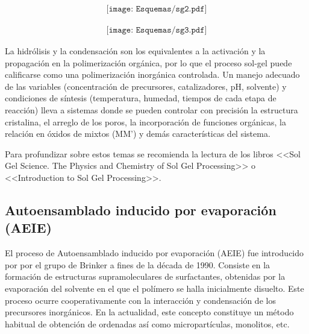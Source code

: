 			\begin{equation}
		    	\begin{aligned}
 	 	 		\texttt{[image: Esquemas/sg2.pdf]}
 	 	 		\end{aligned}
 	 	 		\label{eq:oxosg2}
 	 	 		\end{equation}

			\begin{equation}
 	 	 		\begin{aligned}
 	 	 		\texttt{[image: Esquemas/sg3.pdf]}
 	 	 		\label{eq:olasg3}
 	 	 		\end{aligned}
 	 	 		\end{equation}

	La hidrólisis y la condensación son los equivalentes a la activación y la propagación en la polimerización orgánica, por lo que el proceso sol-gel puede calificarse como una polimerización inorgánica controlada. Un manejo adecuado de las variables (concentración de precursores, catalizadores, pH, solvente) y condiciones de síntesis (temperatura, humedad, tiempos de cada etapa de reacción) lleva a sistemas donde se pueden controlar con precisión  la estructura cristalina, el arreglo de los poros, la incorporación de funciones orgánicas, la relación en óxidos de mixtos (MM') y demás características del sistema.

	Para profundizar sobre estos temas se recomienda la lectura de los libros <<Sol Gel Science. The Physics and Chemistry of Sol Gel Processing>>\cite{Wright2001} o <<Introduction to Sol Gel Processing>>. \cite{Pierre1998} 

	
	
	

	\subsection{Autoensamblado inducido por evaporación (AEIE)}

	El proceso de Autoensamblado inducido por evaporación (AEIE) fue introducido por por el grupo de Brinker a fines de la década de 1990.\cite{Lu1997,Brinker1999} Consiste en la formación de estructuras supramoleculares de surfactantes, obtenidas por la evaporación del solvente en el que el polímero se halla inicialmente disuelto. Este proceso ocurre cooperativamente con la interacción y condensación de los precursores inorgánicos. En la actualidad, este concepto constituye un método habitual de obtención de \pdm\space ordenadas\cite{Grosso2004} así como micropartículas, monolitos, etc.\cite{Yang1998a}

